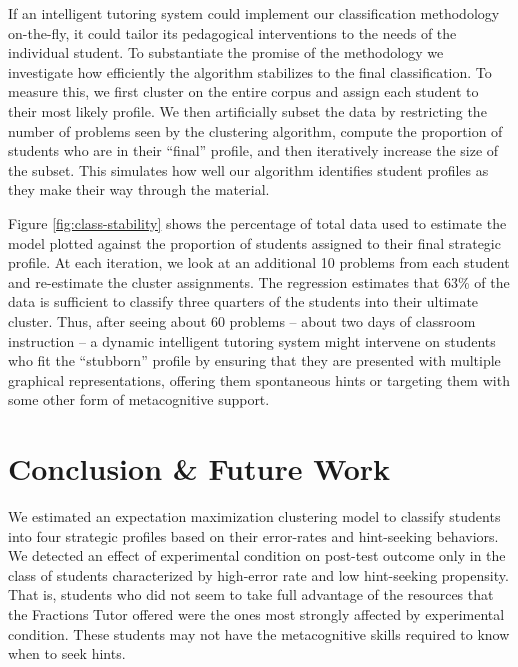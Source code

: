 \documentclass{edm_template}
\begin{document}
If an intelligent tutoring system could implement our classification methodology on-the-fly, it could tailor its pedagogical interventions to the needs of the individual student. To substantiate the promise of the methodology we investigate how efficiently the algorithm stabilizes to the final classification. To measure this, we first cluster on the entire corpus and assign each student to their most likely profile. We then artificially subset the data by restricting the number of problems seen by the clustering algorithm, compute the proportion of students who are in their ``final'' profile, and then iteratively increase the size of the subset. This simulates how well our algorithm identifies student profiles as they make their way through the material. 

Figure \ref{fig:class-stability} shows the percentage of total data used to estimate the model plotted against the proportion of students assigned to their final strategic profile. At each iteration, we look at an additional 10 problems from each student and re-estimate the cluster assignments. The regression estimates that 63\% of the data is sufficient to classify three quarters of the students into their ultimate cluster. Thus, after seeing about 60 problems -- about two days of classroom instruction -- a dynamic intelligent tutoring system might intervene on students who fit the ``stubborn'' profile by ensuring that they are presented with multiple graphical representations, offering them spontaneous hints or targeting them with some other form of metacognitive support. 

\section{Conclusion \& Future Work}
\label{sec:conclusion}

We estimated an expectation maximization clustering model to classify students into four strategic profiles based on their error-rates and hint-seeking behaviors. We detected an effect of experimental condition on post-test outcome only in the class of students characterized by high-error rate and low hint-seeking propensity. That is, students who did not seem to take full advantage of the resources that the Fractions Tutor offered were the ones most strongly affected by experimental condition. These students may not have the metacognitive skills required to know when to seek hints. 
\end{document}
